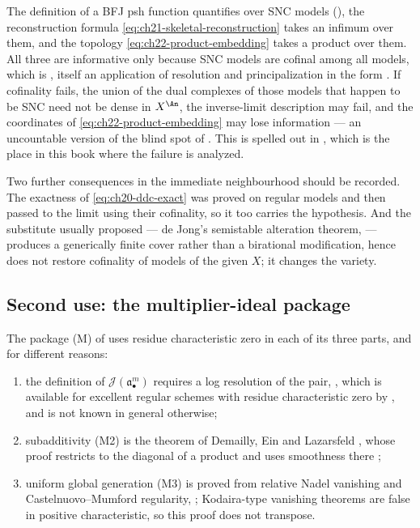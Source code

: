 The definition of a BFJ psh function quantifies over SNC models
(), the reconstruction formula
\eqref{eq:ch21-skeletal-reconstruction} takes an infimum over them, and the
topology \eqref{eq:ch22-product-embedding} takes a product over them.  All
three are informative only because SNC models are cofinal among all models,
which is , itself an application of resolution and
principalization in the form .  If cofinality
fails, the union of the dual complexes of those models that happen to be SNC
need not be dense in \(X^{\An}\), the inverse-limit description
 may fail, and the coordinates of
\eqref{eq:ch22-product-embedding} may lose information --- an uncountable
version of the blind spot of
.  This is spelled out in
, which is the place in this book where the
failure is analyzed.

Two further consequences in the immediate neighbourhood should be recorded.
The exactness of \eqref{eq:ch20-ddc-exact} was proved on regular models and
then passed to the limit using their cofinality, so it too carries the
hypothesis.  And the substitute usually proposed --- de Jong's semistable
alteration theorem,  --- produces a generically
finite cover rather than a birational modification, hence does not restore
cofinality of models of the given \(X\); it changes the variety.

\subsection{Second use: the multiplier-ideal package}

The package \textup{(M)} of  uses residue
characteristic zero in each of its three parts, and for different reasons:

\begin{enumerate}
\item the definition of \(\mathcal J(\mathfrak a_\bullet^m)\) requires a log
resolution of the pair, , which is available
for excellent regular schemes with residue characteristic zero by
, and is not known in general otherwise;
\item subadditivity (M2) is the theorem of Demailly, Ein and Lazarsfeld
, whose proof restricts to the
diagonal of a product and uses smoothness there
\cite[Theorem~2.3]{DEL00};
\item uniform global generation (M3) is proved from relative Nadel vanishing
and Castelnuovo--Mumford regularity, ;
Kodaira-type vanishing theorems are false in positive characteristic, so
this proof does not transpose.
\end{enumerate}

